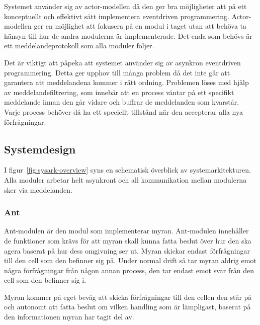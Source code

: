 \documentclass[12pt]{article}
\begin{document}
Systemet använder sig av actor-modellen då den ger bra möjligheter att på ett konceptuellt och effektivt sätt implementera eventdriven programmering.
Actor-modellen ger en möjlighet att fokusera på en modul i taget utan att behöva ta hänsyn till hur de andra modulerna är implementerade.
Det enda som behövs är ett meddelandeprotokoll som alla moduler följer.

Det är viktigt att påpeka att systemet använder sig av asynkron eventdriven programmering.
Detta ger upphov till många problem då det inte går att garantera att meddelandena kommer i rätt ordning.
Problemen löses med hjälp av meddelandefiltrering,
som innebär att en process väntar på ett specifikt meddelande innan den går vidare och buffrar de meddelanden som kvarstår.
Varje process behöver då ha ett speciellt tillstånd när den accepterar alla nya förfrågningar.

\subsection{Systemdesign}
I figur~\ref{fig:sysark-overview} syns en schematisk överblick av systemarkitekturen.
Alla moduler arbetar helt asynkront och all kommunikation mellan modulerna sker via meddelanden.

\subsubsection{Ant}
Ant-modulen är den modul som implementerar myran.
Ant-modulen innehåller de funktioner som krävs för att myran skall kunna fatta beslut över hur den ska agera baserat på hur dess omgivning ser ut.
Myran skickar endast förfrågningar till den cell som den befinner sig på.
Under normal drift så tar myran aldrig emot några förfrågningar från någon annan process,
den tar endast emot svar från den cell som den befinner sig i.

Myran kommer på eget bevåg att skicka förfrågningar till den cellen den står på och autonomt att fatta beslut om vilken handling som är lämpligast,
baserat på den informationen myran har tagit del av.
\end{document}
